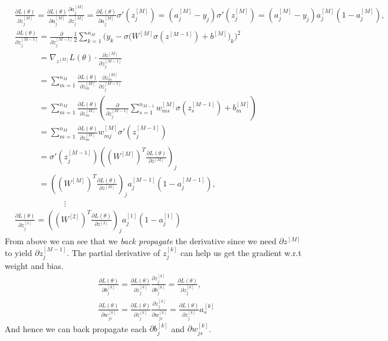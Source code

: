 \documentclass[../main.tex]{subfiles}
\begin{document}
            \begin{align*}
                & \frac{\partial L(\theta)}{\partial z_j^{[M]}} = \frac{\partial L(\theta)}{\partial a_j^{[M]}}\frac{\partial a_j^{[M]}}{\partial z_j^{[M]}}=\frac{\partial L(\theta)}{\partial a_j^{[M]}}\sigma'(z_j^{[M]})=(a_j^{[M]}-y_j)\sigma'(z_j^{[M]})=(a_j^{[M]}-y_j)a_j^{[M]}(1-a_j^{[M]}), \\
                & \frac{\partial L(\theta)}{\partial z_j^{[M-1]}} = \frac{\partial}{\partial z_j^{[M-1]}}\frac{1}{2}\sum_{k=1}^{n_M}\Big(y_k-\sigma\big(W^{[M]}\sigma(z^{[M-1]}) +b^{[M]}\big)_k\Big)^2 \\
                & \phantom{\frac{\partial L(\theta)}{\partial z_j^{[M-1]}}} =\nabla_{z^{[M]}}L(\theta)\cdot\frac{\partial z^{[M]}}{\partial z_j^{[M-1]}} \\
                & \phantom{\frac{\partial L(\theta)}{\partial z_j^{[M-1]}}} = \sum_{m=1}^{n_M} \frac{\partial L(\theta)}{\partial z_m^{[M]}}\frac{\partial z_m^{[M]}}{\partial z_j^{[M-1]}} \\
                & \phantom{\frac{\partial L(\theta)}{\partial z_j^{[M-1]}}} = \sum_{m=1}^{n_M} \frac{\partial L(\theta)}{\partial z_m^{[M]}}\left(\frac{\partial}{\partial z_j^{[M-1]}}\sum_{s=1}^{n_{M-1}}w_{ms}^{[M]}\sigma(z_s^{[M-1]})+b_m^{[M]}\right) \\
                & \phantom{\frac{\partial L(\theta)}{\partial z_j^{[M-1]}}} = \sum_{m=1}^{n_M} \frac{\partial L(\theta)}{\partial z_m^{[M]}}w_{mj}^{[M]}\sigma'(z_j^{[M-1]}) \\
                & \phantom{\frac{\partial L(\theta)}{\partial z_j^{[M-1]}}} = \sigma'(z_j^{[M-1]})\left((W^{[M]})^T\frac{\partial L(\theta)}{\partial z^{[M]}}\right)_j \\
                & \phantom{\frac{\partial L(\theta)}{\partial z_j^{[M-1]}}} = \left((W^{[M]})^T\frac{\partial L(\theta)}{\partial z^{[M]}}\right)_ja_j^{[M-1]}(1-a_j^{[M-1]}), \\
                & \qquad\qquad\qquad\vdots \\
                & \frac{\partial L(\theta)}{\partial z_j^{[1]}} = \left((W^{[2]})^T\frac{\partial L(\theta)}{\partial z^{[2]}}\right)_ja_j^{[1]}(1-a_j^{[1]})
            \end{align*}
            From above we can see that we \textit{back propagate} the derivative since we need $\partial z^{[M]}$ to yield $\partial z^{[M-1]}_j$. The partial derivative of $z_j^{[k]}$ can help us get the gradient w.r.t weight and bias.
            \begin{align*}
                & \frac{\partial L(\theta)}{\partial b_j^{[k]}}=\frac{\partial L(\theta)}{\partial z_j^{[k]}}\frac{\partial z_j^{[k]}}{\partial b_j^{[k]}}=\frac{\partial L(\theta)}{\partial z_j^{[k]}}, \\
                & \frac{\partial L(\theta)}{\partial w_{js}^{[k]}}=\frac{\partial L(\theta)}{\partial z_j^{[k]}}\frac{\partial z_j^{[k]}}{\partial w_{js}^{[k]}}=\frac{\partial L(\theta)}{\partial z_j^{[k]}}a_s^{[k]}
            \end{align*}
            And hence we can back propagate each $\partial b^{[k]}_j$ and $\partial w^{[k]}_{js}$.
\end{document}
